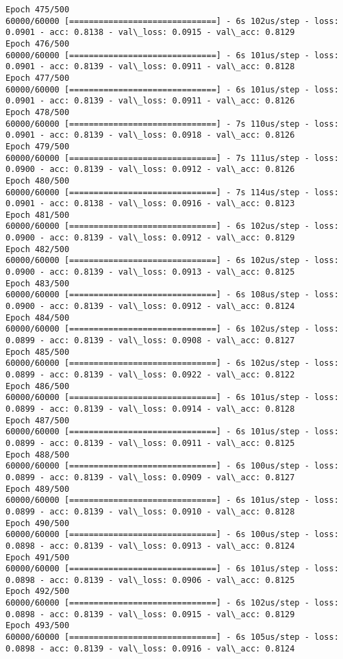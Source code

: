 \documentclass[11pt]{article}
\begin{document}
\begin{Verbatim}[commandchars=\\\{\}]
Epoch 475/500
60000/60000 [==============================] - 6s 102us/step - loss: 0.0901 - acc: 0.8138 - val\_loss: 0.0915 - val\_acc: 0.8129
Epoch 476/500
60000/60000 [==============================] - 6s 101us/step - loss: 0.0901 - acc: 0.8139 - val\_loss: 0.0911 - val\_acc: 0.8128
Epoch 477/500
60000/60000 [==============================] - 6s 101us/step - loss: 0.0901 - acc: 0.8139 - val\_loss: 0.0911 - val\_acc: 0.8126
Epoch 478/500
60000/60000 [==============================] - 7s 110us/step - loss: 0.0901 - acc: 0.8139 - val\_loss: 0.0918 - val\_acc: 0.8126
Epoch 479/500
60000/60000 [==============================] - 7s 111us/step - loss: 0.0900 - acc: 0.8139 - val\_loss: 0.0912 - val\_acc: 0.8126
Epoch 480/500
60000/60000 [==============================] - 7s 114us/step - loss: 0.0901 - acc: 0.8138 - val\_loss: 0.0916 - val\_acc: 0.8123
Epoch 481/500
60000/60000 [==============================] - 6s 102us/step - loss: 0.0900 - acc: 0.8139 - val\_loss: 0.0912 - val\_acc: 0.8129
Epoch 482/500
60000/60000 [==============================] - 6s 102us/step - loss: 0.0900 - acc: 0.8139 - val\_loss: 0.0913 - val\_acc: 0.8125
Epoch 483/500
60000/60000 [==============================] - 6s 108us/step - loss: 0.0900 - acc: 0.8139 - val\_loss: 0.0912 - val\_acc: 0.8124
Epoch 484/500
60000/60000 [==============================] - 6s 102us/step - loss: 0.0899 - acc: 0.8139 - val\_loss: 0.0908 - val\_acc: 0.8127
Epoch 485/500
60000/60000 [==============================] - 6s 102us/step - loss: 0.0899 - acc: 0.8139 - val\_loss: 0.0922 - val\_acc: 0.8122
Epoch 486/500
60000/60000 [==============================] - 6s 101us/step - loss: 0.0899 - acc: 0.8139 - val\_loss: 0.0914 - val\_acc: 0.8128
Epoch 487/500
60000/60000 [==============================] - 6s 101us/step - loss: 0.0899 - acc: 0.8139 - val\_loss: 0.0911 - val\_acc: 0.8125
Epoch 488/500
60000/60000 [==============================] - 6s 100us/step - loss: 0.0899 - acc: 0.8139 - val\_loss: 0.0909 - val\_acc: 0.8127
Epoch 489/500
60000/60000 [==============================] - 6s 101us/step - loss: 0.0899 - acc: 0.8139 - val\_loss: 0.0910 - val\_acc: 0.8128
Epoch 490/500
60000/60000 [==============================] - 6s 100us/step - loss: 0.0898 - acc: 0.8139 - val\_loss: 0.0913 - val\_acc: 0.8124
Epoch 491/500
60000/60000 [==============================] - 6s 101us/step - loss: 0.0898 - acc: 0.8139 - val\_loss: 0.0906 - val\_acc: 0.8125
Epoch 492/500
60000/60000 [==============================] - 6s 102us/step - loss: 0.0898 - acc: 0.8139 - val\_loss: 0.0915 - val\_acc: 0.8129
Epoch 493/500
60000/60000 [==============================] - 6s 105us/step - loss: 0.0898 - acc: 0.8139 - val\_loss: 0.0916 - val\_acc: 0.8124

\end{Verbatim}
\end{document}
